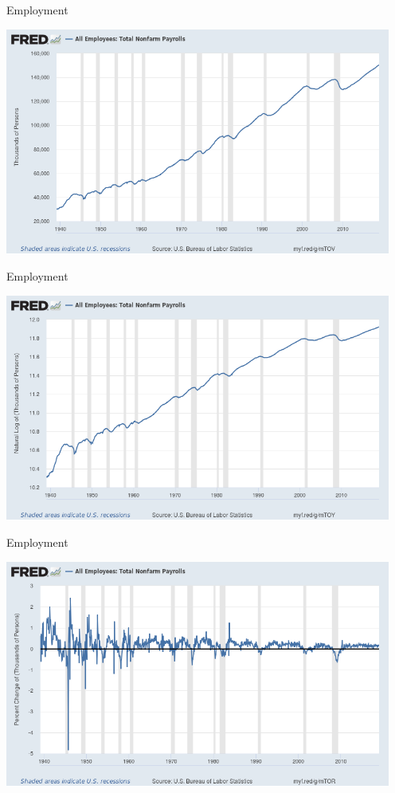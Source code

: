 \begin{frame}{Employment}
\begin{center}
\includegraphics[width=5in]{./resources/nonfarm_level.png}
\end{center}
\end{frame}

\begin{frame}{Employment}
\begin{center}
\includegraphics[width=5in]{./resources/nonfarm_log.png}
\end{center}
\end{frame}

\begin{frame}{Employment}
\begin{center}
\includegraphics[width=5in]{./resources/nonfarm_pct.png}
\end{center}
\end{frame}

